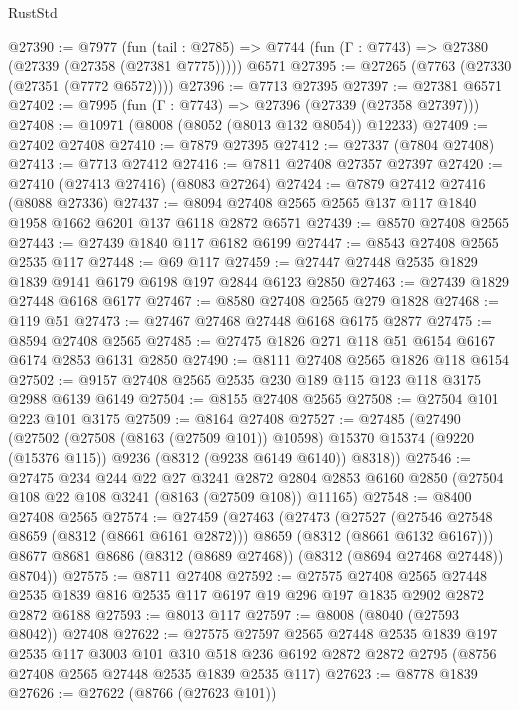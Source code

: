 \begin{lexlean}{RustStd}
\begin{coremodule}
@27390 := @7977
    (fun (tail : @2785) => @7744 (fun (Γ : @7743) => @27380 (@27339 (@27358 (@27381 @7775)))))
    @6571
@27395 := @27265 (@7763 (@27330 (@27351 (@7772 @6572))))
@27396 := @7713 @27395
@27397 := @27381 @6571
@27402 := @7995 (fun (Γ : @7743) => @27396 (@27339 (@27358 @27397)))
@27408 := @10971 (@8008 (@8052 (@8013 @132 @8054)) @12233)
@27409 := @27402 @27408
@27410 := @7879 @27395
@27412 := @27337 (@7804 @27408)
@27413 := @7713 @27412
@27416 := @7811 @27408 @27357 @27397
@27420 := @27410 (@27413 @27416) (@8083 @27264)
@27424 := @7879 @27412 @27416 (@8088 @27336)
@27437 := @8094 @27408 @2565 @2565 @137 @117 @1840 @1958 @1662 @6201 @137 @6118 @2872 @6571
@27439 := @8570 @27408 @2565
@27443 := @27439 @1840 @117 @6182 @6199
@27447 := @8543 @27408 @2565 @2535 @117
@27448 := @69 @117
@27459 := @27447 @27448 @2535 @1829 @1839 @9141 @6179 @6198 @197 @2844 @6123 @2850
@27463 := @27439 @1829 @27448 @6168 @6177
@27467 := @8580 @27408 @2565 @279 @1828
@27468 := @119 @51
@27473 := @27467 @27468 @27448 @6168 @6175 @2877
@27475 := @8594 @27408 @2565
@27485 := @27475 @1826 @271 @118 @51 @6154 @6167 @6174 @2853 @6131 @2850
@27490 := @8111 @27408 @2565 @1826 @118 @6154
@27502 := @9157 @27408 @2565 @2535 @230 @189 @115 @123 @118 @3175 @2988 @6139 @6149
@27504 := @8155 @27408 @2565
@27508 := @27504 @101 @223 @101 @3175
@27509 := @8164 @27408
@27527 := @27485
    (@27490
      (@27502
        (@27508 (@8163 (@27509 @101)) @10598)
        @15370
        @15374
        (@9220 (@15376 @115))
        @9236
        (@8312 (@9238 @6149 @6140))
        @8318))
@27546 := @27475
    @234
    @244
    @22
    @27
    @3241
    @2872
    @2804
    @2853
    @6160
    @2850
    (@27504 @108 @22 @108 @3241 (@8163 (@27509 @108)) @11165)
@27548 := @8400 @27408 @2565
@27574 := @27459
    (@27463
      (@27473
        (@27527 (@27546 @27548 @8659 (@8312 (@8661 @6161 @2872))) @8659 (@8312 (@8661 @6132 @6167)))
        @8677
        @8681
        @8686
        (@8312 (@8689 @27468))
        (@8312 (@8694 @27468 @27448))
        @8704))
@27575 := @8711 @27408
@27592 := @27575
    @27408
    @2565
    @27448
    @2535
    @1839
    @816
    @2535
    @117
    @6197
    @19
    @296
    @197
    @1835
    @2902
    @2872
    @2872
    @6188
@27593 := @8013 @117
@27597 := @8008 (@8040 (@27593 @8042)) @27408
@27622 := @27575
    @27597
    @2565
    @27448
    @2535
    @1839
    @197
    @2535
    @117
    @3003
    @101
    @310
    @518
    @236
    @6192
    @2872
    @2872
    @2795
    (@8756 @27408 @2565 @27448 @2535 @1839 @2535 @117)
@27623 := @8778 @1839
@27626 := @27622 (@8766 (@27623 @101))

\end{coremodule}
\end{lexlean}
